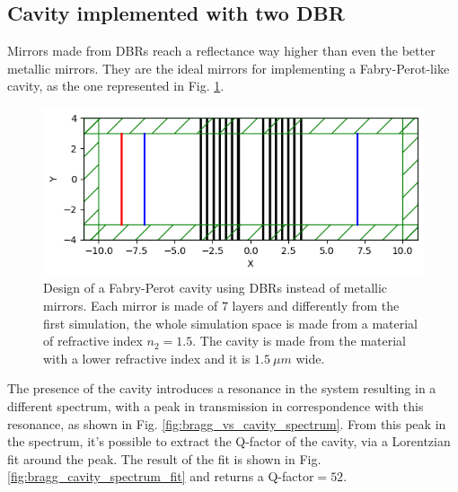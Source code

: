 \subsection{Cavity implemented with two DBR}
Mirrors made from DBRs reach a reflectance way higher than even the better metallic mirrors. They are the ideal mirrors for implementing a Fabry-Perot-like cavity, as the one represented in Fig. \ref{fig:bragg_cavity_design}.

\begin{figure}[H]
    \centering
    \includegraphics[width=0.8\linewidth]{Figures/bragg_cavity_design.png}
    \caption{Design of a Fabry-Perot cavity using DBRs instead of metallic mirrors. Each mirror is made of 7 layers and differently from the first simulation, the whole simulation space is made from a material of refractive index \(n_2 = 1.5\). The cavity is made from the material with a lower refractive index and it is \(1.5\ \mu m\) wide.}
    \label{fig:bragg_cavity_design}
\end{figure}

The presence of the cavity introduces a resonance in the system resulting in a different spectrum, with a peak in transmission in correspondence with this resonance, as shown in Fig. \ref{fig:bragg_vs_cavity_spectrum}. From this peak in the spectrum, it's possible to extract the Q-factor of the cavity, via a Lorentzian fit around the peak. The result of the fit is shown in Fig. \ref{fig:bragg_cavity_spectrum_fit} and returns a Q-factor\(=52\).

